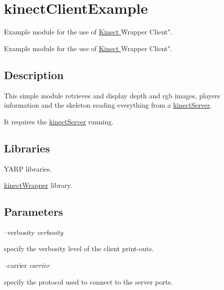 \section{kinect\+Client\+Example}
\label{group__kinectClientExample}


Example module for the use of \hyperlink{group__kinectClientExample}{Kinect }Wrapper Client".  


Example module for the use of \hyperlink{group__kinectClientExample}{Kinect }Wrapper Client". 

\hypertarget{group__kinectServer_intro_sec}{}\subsection{Description}\label{group__kinectServer_intro_sec}
This simple module retrieves and display depth and rgb images, players information and the skeleton reading everything from a \hyperlink{group__kinectServer}{kinect\+Server}.

It requires the \hyperlink{group__kinectServer}{kinect\+Server} running.\hypertarget{group__kinectServer_lib_sec}{}\subsection{Libraries}\label{group__kinectServer_lib_sec}

\begin{DoxyItemize}
\item Y\+A\+R\+P libraries.
\item \hyperlink{group__kinectWrapper}{kinect\+Wrapper} library.
\end{DoxyItemize}\hypertarget{group__kinectServer_parameters_sec}{}\subsection{Parameters}\label{group__kinectServer_parameters_sec}
--verbosity {\itshape verbosity} 
\begin{DoxyItemize}
\item specify the verbosity level of the client print-\/outs.
\end{DoxyItemize}

--carrier {\itshape carrier} 
\begin{DoxyItemize}
\item specify the protocol used to connect to the server ports.
\end{DoxyItemize}

